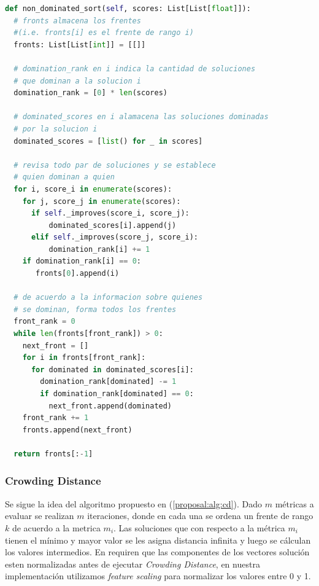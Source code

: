 \begin{lstlisting}[caption=Non Dominated Sorting, language=Python]
def non_dominated_sort(self, scores: List[List[float]]):
  # fronts almacena los frentes 
  #(i.e. fronts[i] es el frente de rango i)
  fronts: List[List[int]] = [[]]

  # domination_rank en i indica la cantidad de soluciones
  # que dominan a la solucion i
  domination_rank = [0] * len(scores)

  # dominated_scores en i alamacena las soluciones dominadas
  # por la solucion i
  dominated_scores = [list() for _ in scores]

  # revisa todo par de soluciones y se establece
  # quien dominan a quien
  for i, score_i in enumerate(scores):
    for j, score_j in enumerate(scores):
      if self._improves(score_i, score_j):
          dominated_scores[i].append(j)
      elif self._improves(score_j, score_i):
          domination_rank[i] += 1
    if domination_rank[i] == 0:
       fronts[0].append(i)

  # de acuerdo a la informacion sobre quienes
  # se dominan, forma todos los frentes
  front_rank = 0
  while len(fronts[front_rank]) > 0:
    next_front = []
    for i in fronts[front_rank]:
      for dominated in dominated_scores[i]:
        domination_rank[dominated] -= 1
        if domination_rank[dominated] == 0:
          next_front.append(dominated)
    front_rank += 1
    fronts.append(next_front)

  return fronts[:-1]
\end{lstlisting}

\subsubsection{Crowding Distance}
Se sigue la idea del algoritmo propuesto en (\ref{proposal:alg:cd}). Dado $m$ m\'etricas a evaluar se realizan $m$ iteraciones, donde en cada una se ordena un frente de rango $k$ de acuerdo a la metrica $m_i$. Las soluciones que con respecto a la m\'etrica $m_i$ tienen el m\'inimo y mayor valor se les asigna distancia infinita y luego se c\'alculan los valores intermedios. En \cite{deb2002fast} requiren que las componentes de los vectores soluci\'on esten normalizadas antes de ejecutar \textit{Crowding Distance}, en nuestra implementaci\'on utilizamos \textit{feature scaling} para normalizar los valores entre 0 y 1.

